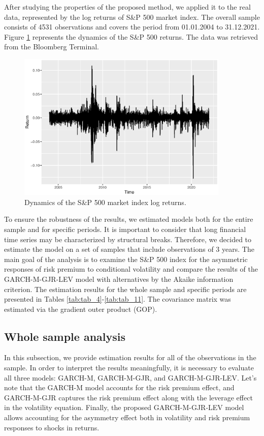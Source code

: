 \documentclass[authoryear, 1p]{elsarticle}
\numberwithin{equation}{section}
\begin{document}
After studying the properties of the proposed method, we applied it to the real data, represented by the log returns of S\&P 500 market index. The overall sample consists of 4531 observations and covers the period from 01.01.2004 to 31.12.2021. Figure \ref{fig:plot_0} represents the dynamics of the S\&P 500 returns. The data was retrieved from the Bloomberg Terminal.

\begin{figure}[h!] %
\centering
\includegraphics[width=0.9\textwidth]{Plots/Returns.eps}
\caption{Dynamics of the S\&P 500 market index log returns.}
\label{fig:plot_0}
\end{figure}

To ensure the robustness of the results, we estimated models both for the entire sample and for specific periods. It is important to consider that long financial time series may be characterized by structural breaks. Therefore, we decided to estimate the model on a set of samples that include observations of 3 years. The main goal of the analysis is to examine the S\&P 500 index for the asymmetric responses of risk premium to conditional volatility and compare the results of the GARCH-M-GJR-LEV model with alternatives by the Akaike information criterion. The estimation results for the whole sample and specific periods are presented in Tables \ref{tab:tab_4}-\ref{tab:tab_11}. The covariance matrix was estimated via the gradient outer product (GOP).

\subsection{Whole sample analysis}

In this subsection, we provide estimation results for all of the observations in the sample. In order to interpret the results meaningfully, it is necessary to evaluate all three models: GARCH-M, GARCH-M-GJR, and GARCH-M-GJR-LEV. Let's note that the GARCH-M model accounts for the risk premium effect, and GARCH-M-GJR captures the risk premium effect along with the leverage effect in the volatility equation. Finally, the proposed GARCH-M-GJR-LEV model allows accounting for the asymmetry effect both in volatility and risk premium responses to shocks in returns.  
\end{document}
